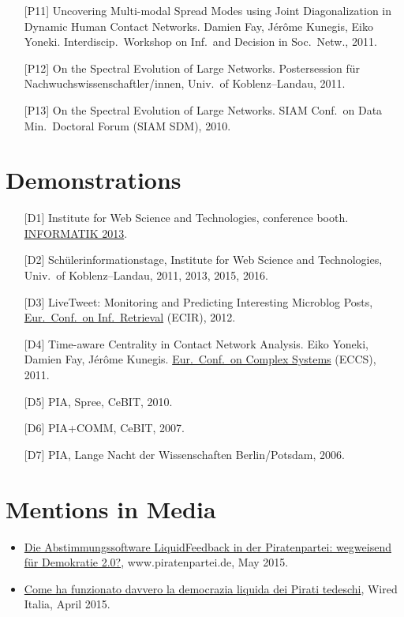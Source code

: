 \documentclass[line,margin]{res}
\newcounter{x}
\begin{document}
\begin{resume}
\begin{itemize}
  \item[{[P11]}]
    Uncovering Multi-modal Spread Modes using Joint 
    Diagonalization in Dynamic Human Contact Networks. 
    Damien Fay, Jérôme Kunegis, Eiko Yoneki.  Interdiscip.\ Workshop on Inf.\ and Decision in Soc.\ Netw., 2011. 
  \item[{[P12]}]
    On the Spectral Evolution of Large Networks. Postersession 
    für Nachwuchswissenschaftler/innen, Univ.\ of Koblenz--Landau,
    2011. 
  \item[{[P13]}]
    On the Spectral Evolution of Large Networks. SIAM 
    Conf.\ on Data Min.\ Doctoral Forum (SIAM SDM), 2010. 
\end{itemize}

\section{Demonstrations}
\begin{itemize}
 \item[{[D1]}] Institute for Web Science and Technologies, conference booth.
       \href{http://informatik2013.de}{INFORMATIK 2013}.  
 \item[{[D2]}] Schülerinformationstage, Institute for Web Science and
       Technologies, Univ.\ of Koblenz--Landau, 2011, 2013, 2015, 2016.  
 \item[{[D3]}] LiveTweet: Monitoring and Predicting Interesting Microblog
       Posts, \href{http://ecir2012.upf.edu/}{Eur.\ Conf.\ on Inf.\ Retrieval} (ECIR),
       2012. 
 \item[{[D4]}] Time-aware Centrality in Contact Network Analysis.
       Eiko Yoneki, Damien Fay, Jérôme Kunegis.
       \href{http://www.eccs2011.eu/}{Eur.\ Conf.\ on Complex Systems} (ECCS), 2011. 
 \item[{[D5]}] PIA, Spree, CeBIT, 2010.
 \item[{[D6]}] PIA+COMM, CeBIT, 2007.
 \item[{[D7]}] PIA, Lange Nacht der Wissenschaften Berlin/Potsdam, 2006. 
\end{itemize}

\section{Mentions in Media}
\begin{itemize}
  \item
    \href{https://www.piratenpartei.de/2015/05/31/die-abstimmungssoftware-liquidfeedback-der-piratenpartei-wegweisend-fuer-demokratie-2-0/}{Die
      Abstimmungssoftware LiquidFeedback in der Piratenpartei:
      wegweisend für Demokratie 2.0?}, www.piratenpartei.de, May 2015. 
\item
  \href{http://www.wired.it/attualita/2015/04/01/come-funzionato-davvero-democrazia-liquida-dei-pirati-tedeschi/}{Come
    ha funzionato davvero la democrazia liquida dei Pirati tedeschi},
  Wired Italia, April 2015. 
\end{itemize}


\end{resume}
\end{document}
